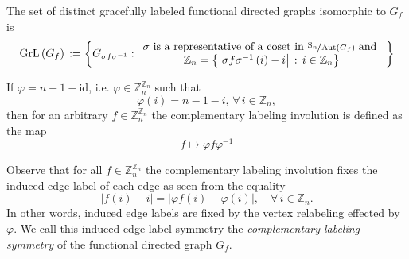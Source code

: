 \begin{definition}\label{defn:graceful-functional-graphs-set}
The set of distinct gracefully labeled functional directed graphs isomorphic to $G_{f}$ is 
\[
\text{GrL}\left(G_{f}\right)\,:=\left\{ G_{\sigma f\sigma^{-1}}:\begin{array}{c}
\sigma\text{ is a representative of a coset in }\nicefrac{\text{S}_{n}}{\text{Aut}\left(G_{f}\right)}\text{ and }\\
\mathbb{Z}_{n}=\left\{ \left|\sigma f\sigma^{-1}\left(i\right)-i\right|\,:\,i\in\mathbb{Z}_{n}\right\} 
\end{array}\right\} 
\]
\end{definition}
\begin{definition}\label{defn:complementary-labeling-symmetry}
If $\varphi=n-1-\text{id}$, i.e. $\varphi \in \mathbb{Z}_{n}^{\mathbb{Z}_{n}}$ such that
\[
\varphi(i)=n-1-i,\, \forall \,i\in \mathbb{Z}_{n},
\]
then for an arbitrary $f\in\mathbb{Z}_{n}^{\mathbb{Z}_{n}}$ the complementary labeling involution is defined as the map
\[
f \mapsto \varphi f \varphi^{-1}
\]
\end{definition}
Observe that for all $f\in \mathbb{Z}_{n}^{\mathbb{Z}_{n}}$ the complementary labeling involution fixes the induced edge label of each edge as seen from the equality
\begin{equation}
\left|f(i)-i\right|=\left|\varphi f(i)-\varphi(i)\right|,\quad\forall\,i\in\mathbb{Z}_{n}.
\end{equation}
In other words, induced edge labels are fixed by the vertex relabeling effected by $\varphi$. We call this induced edge label symmetry the \emph{complementary labeling symmetry} of the functional directed graph $G_f$.

